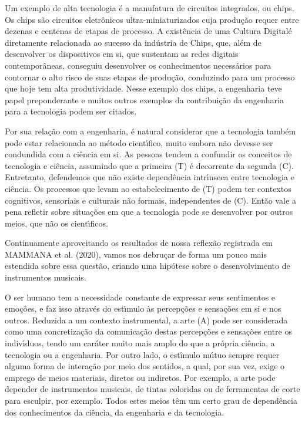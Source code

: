 \documentclass[
12pt,		%
openright,	%
twoside,  %
a4paper,			%
chapter=TITLE,		%
english,			%
french,				%
spanish,			%
brazil				%
]{USPSC-classe/USPSC}
\begin{document}
Um exemplo de alta tecnologia \'e a manufatura de circuitos integrados, ou chips. Os chips s\~ao circuitos eletr\^onicos ultra-miniaturizados cuja produ\c{c}\~ao requer entre dezenas e centenas de etapas de processo. A exist\^encia de uma \textquotedbl Cultura Digital\textquotedbl  \'e diretamente relacionada ao sucesso da ind\'ustria de Chips, que, al\'em de desenvolver os dispositivos em si, que sustentam as redes digitais contempor\^aneas, conseguiu desenvolver os conhecimentos necess\'arios para contornar o alto risco de suas etapas de produ\c{c}\~ao, conduzindo para um processo que hoje tem alta produtividade. Nesse exemplo dos chips, a engenharia teve papel preponderante e muitos outros exemplos da contribui\c{c}\~ao da engenharia para a tecnologia podem ser citados.




Por sua rela\c{c}\~ao com a engenharia, \'e natural considerar que a tecnologia tamb\'em pode estar relacionada ao m\'etodo cient\'{\i}fico, muito embora n\~ao devesse ser condundida com a ci\^encia em si. As pessoas tendem a confundir os conceitos de tecnologia e ci\^encia, assumindo que a primeira (T) \'e decorrente da segunda (C). Entretanto, defendemos que n\~ao existe depend\^encia intr\'{\i}nseca entre tecnologia e ci\^encia. Os processos que levam ao estabelecimento de (T) podem ter contextos cognitivos, sensoriais e culturais n\~ao formais, independentes de (C). Ent\~ao vale a pena refletir sobre situa\c{c}\~oes em que a tecnologia pode se desenvolver por outros meios, que n\~ao os cient\'{\i}ficos.




Continuamente aproveitando os resultados de nossa reflex\~ao registrada em  MAMMANA et al. (2020), vamos nos debru\c{c}ar de forma um pouco mais estendida sobre essa quest\~ao, criando uma hip\'otese sobre o desenvolvimento de instrumentos musicais.




O ser humano tem a necessidade constante de expressar seus sentimentos e emo\c{c}\~oes, e faz isso atrav\'es do est\'{\i}mulo \`as percep\c{c}\~oes e sensa\c{c}\~oes em si e nos outros. Reduzida a um contexto instrumental, a arte (A) pode ser considerada como uma concretiza\c{c}\~ao da comunica\c{c}\~ao destas percep\c{c}\~oes e sensa\c{c}\~oes entre os indiv\'{\i}duos, tendo um car\'ater muito mais amplo do que a pr\'opria ci\^encia, a tecnologia ou a engenharia. Por outro lado, o est\'{\i}mulo m\'utuo sempre requer alguma forma de intera\c{c}\~ao por meio dos sentidos, a qual, por sua vez, exige o emprego de meios materiais, diretos ou indiretos. Por exemplo, a arte pode depender de instrumentos musicais, de tintas coloridas ou de ferramentas de corte para esculpir, por exemplo. Todos estes meios t\^em um certo grau de depend\^encia dos conhecimentos da ci\^encia, da engenharia e da tecnologia.
\end{document}
